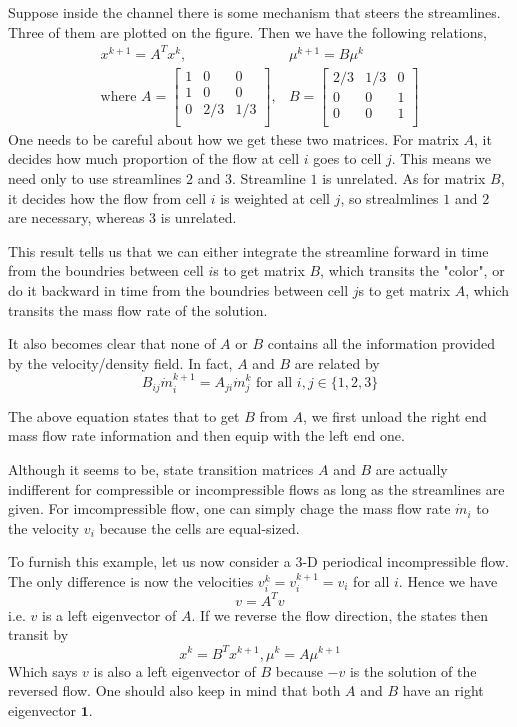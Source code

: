 Suppose inside the channel there is some mechanism that steers the streamlines. Three of them are plotted on the figure. Then we have the following relations,
\begin{eqnarray*}
 x^{k+1} = A^T x^k, &  \mu^{k+1} = B \mu^{k} \\  \mbox{where  }
 A = \left[\begin{matrix}
        1 & 0 & 0 \\
        1 & 0 & 0 \\
        0 & 2/3 & 1/3\\ 
     \end{matrix}\right], & 
 B = \left[\begin{matrix}
        2/3 & 1/3 & 0 \\
        0 & 0 & 1 \\
        0 & 0 & 1\\ 
     \end{matrix}\right]
\end{eqnarray*}
One needs to be careful about how we get these two matrices. For matrix $A$, it decides how much proportion of the flow at cell $i$ goes to cell $j$. This means we need only to use streamlines $2$ and $3$. Streamline $1$ is unrelated. As for matrix $B$, it decides how the flow from cell $i$ is weighted at cell $j$, so strealmlines $1$ and $2$ are necessary, whereas $3$ is unrelated. 

This result tells us that we can either integrate the streamline forward in time from the boundries between cell $i$s to get matrix $B$, which transits the "color", or do it backward in time from the boundries between cell $j$s to get matrix $A$, which transits the mass flow rate of the solution. 

It also becomes clear that none of $A$ or $B$ contains all the information provided by the velocity/density field. In fact, $A$ and $B$ are related by
$$ B_{ij}{\dot{m}_i^{k+1}} = A_{ji} {\dot{m}_j^k} \mbox{  for all } i,j \in \{1,2,3\}$$

The above equation states that to get $B$ from $A$, we first unload the right end mass flow rate information and then equip with the left end one. 

Although it seems to be, state transition matrices $A$ and $B$ are actually indifferent for compressible or incompressible flows as long as the streamlines are given. For imcompressible flow, one can simply chage the mass flow rate $\dot{m}_i$ to the velocity $v_i$ because the cells are equal-sized.  

To furnish this example, let us now consider a 3-D periodical incompressible flow. The only difference is now the velocities $v^{k}_i = v^{k+1}_i= v_i$ for all $i$. Hence we have
$$ v = A^T v$$
i.e. $v$ is a left eigenvector of $A$. 
If we reverse the flow direction, the states then transit by
$$ x^k = B^T x^{k+1} , \mu^k = A \mu^{k+1}$$
Which says $v$ is also a left eigenvector of $B$ because $-v$ is the solution of the reversed flow. One should also keep in mind that both $A$ and $B$ have an right eigenvector $\mathbf{1}$.
  

